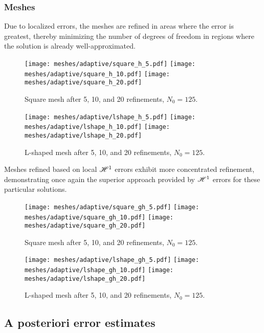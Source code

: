 \newpage
\subsubsection{Meshes}

Due to localized errors, the meshes are refined in areas where the error is greatest, thereby minimizing the number of degrees of freedom in regions where the solution is already well-approximated.

\begin{figure}[!ht]
	\centering
	\texttt{[image: meshes/adaptive/square\_h\_5.pdf]}
	\texttt{[image: meshes/adaptive/square\_h\_10.pdf]}
	\texttt{[image: meshes/adaptive/square\_h\_20.pdf]}
	\caption{Square mesh after 5, 10, and 20 refinements, $N_0 = 125$.}
\end{figure}

\begin{figure}[!ht]
	\centering
	\texttt{[image: meshes/adaptive/lshape\_h\_5.pdf]}
	\texttt{[image: meshes/adaptive/lshape\_h\_10.pdf]}
	\texttt{[image: meshes/adaptive/lshape\_h\_20.pdf]}
	\caption{L-shaped mesh after 5, 10, and 20 refinements, $N_0 = 125$.}
\end{figure}

\newpage

Meshes refined based on local $\mathscr{H}^1$ errors exhibit more concentrated refinement, demonstrating once again the superior approach provided by $\mathscr{H}^1$ errors for these particular solutions.

\begin{figure}[!ht]
	\centering
	\texttt{[image: meshes/adaptive/square\_gh\_5.pdf]}
	\texttt{[image: meshes/adaptive/square\_gh\_10.pdf]}
	\texttt{[image: meshes/adaptive/square\_gh\_20.pdf]}
	\caption{Square mesh after 5, 10, and 20 refinements, $N_0 = 125$.}
\end{figure}

\begin{figure}[!ht]
	\centering
	\texttt{[image: meshes/adaptive/lshape\_gh\_5.pdf]}
	\texttt{[image: meshes/adaptive/lshape\_gh\_10.pdf]}
	\texttt{[image: meshes/adaptive/lshape\_gh\_20.pdf]}
	\caption{L-shaped mesh after 5, 10, and 20 refinements, $N_0 = 125$.}
\end{figure}

\newpage
\subsection{A posteriori error estimates}

